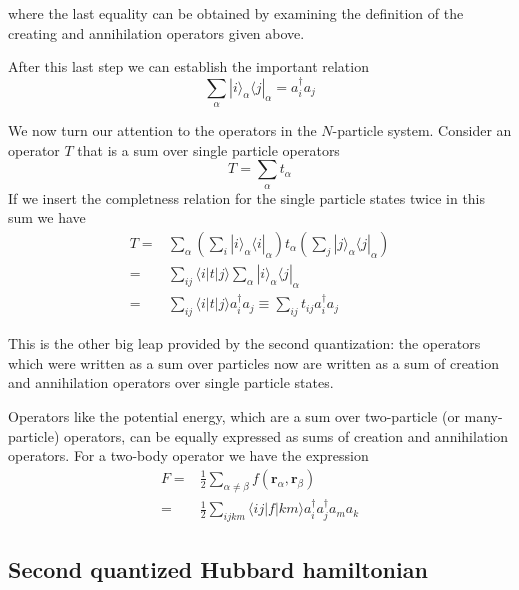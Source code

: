 \documentclass[oneside,11pt]{memoir}
\newcommand{\bv}[1]{\ensuremath{\bm{#1}}}
\begin{document}
where the last equality can be obtained by examining the definition of the
creating and annihilation operators given above. 

After this last step we can establish the important relation
\begin{equation}
   \sum_{\alpha} |i\rangle_{\alpha} \langle j | _{\alpha} = 
     a_{i}^{\dagger} a_{j} 
\end{equation}

We now turn our attention to the operators in the $N$-particle system.
Consider an operator $T$ that is a sum over single particle operators
\begin{equation}
  T = \sum_{\alpha} t_{\alpha}
\end{equation}  
If we insert the completness relation for the single particle states twice in
this sum we have \begin{equation}
\begin{split}
  T = & \sum_{\alpha} \left( \sum_{i} |i\rangle_{\alpha}\langle i |_{\alpha} \right)
        t_{\alpha} \left( \sum_{j} |j\rangle_{\alpha}\langle j |_{\alpha} \right) \\
    = & \sum_{ij}   \langle i | t | j \rangle  \sum_{\alpha} |i\rangle_{\alpha} \langle j |_{\alpha} \\ 
    = & \sum_{ij}   \langle i | t | j \rangle a_{i}^{\dagger} a_{j} \equiv \sum_{ij} t_{ij}   a_{i}^{\dagger} a_{j} 
\end{split}  
\end{equation}

This is the other big leap provided by the second quantization:  the operators
which were written as a sum over particles now are written as a sum of creation
and annihilation operators over single particle states.   

Operators like the potential energy, which are a sum over two-particle (or
many-particle) operators,  can be equally expressed as sums of creation and
annihilation operators.  For a two-body operator we have the expression
\begin{equation}
\begin{split}
F = & \frac{1}{2} \sum_{\alpha\neq\beta} f(\bv{r}_{\alpha}, \bv{r}_{\beta} )  \\
  = & \frac{1}{2} \sum_{ijkm} \langle ij | f | km \rangle a_{i}^{\dagger} a_{j}^{\dagger} a_{m} a_{k} 
\end{split}
\end{equation}

\subsection{Second quantized Hubbard hamiltonian}
\end{document}
